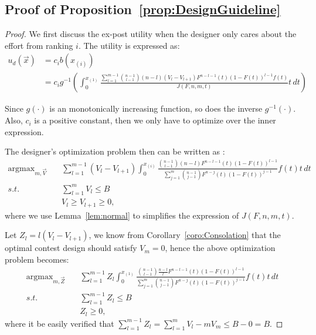 \subsection*{Proof of Proposition~\ref{prop:DesignGuideline}}
\begin{proof}
    We first discuss the ex-post utility when the designer only cares about the effort from ranking $i$. The utility is expressed as:
    \[
    \begin{aligned}
        u_d(\vec{x})  & = c_i b(x_{(i)}) \\
             & = c_ig^{-1}\left(\int_{0}^{x_{(1)}}\frac{\sum_{l=1}^{m-1}\binom{n-1}{l-1}(n-l)(V_l-V_{l+1})F^{n-l-1}(t)(1-F(t))^{l-1}f(t)}{J(F,n,m,t)} t\, dt \right)
    \end{aligned}
    \]
    
    Since $g(\cdot)$ is an monotonically increasing function, so does the inverse $g^{-1}(\cdot)$. Also, $c_i$ is a positive constant, then we only have to optimize over the inner expression. 

    The designer's optimization problem then can be written as :
    \[
    \begin{aligned}
        \mathop{\arg \max}_{m,\vec{V}} \quad & \sum_{l=1}^{m-1}(V_l-V_{l+1})\int_{0}^{x_{(i)}}\frac{\binom{n-1}{l-1}(n-l)F^{n-l-1}(t)(1-F(t))^{l-1}}{\sum_{j=1}^{m}\binom{n-1}{j-1}F^{n-j}(t)(1-F(t))^{j-1}}f(t) t \, dt \\
        s.t. \quad & \sum_{l=1}^{m} V_l \leq B \\
            & V_l  \geq V_{l+1} \geq 0,
    \end{aligned}
    \]
    where we use Lemma~\ref{lem:normal} to simplifies the expression of $J(F,n,m,t)$. 

    Let $Z_l=l(V_l-V_{l+1})$, we know from Corollary~\ref{coro:Consolation} that the optimal contest design should satisfy $V_m=0$, hence the above optimization problem becomes:
    \begin{equation}\label{eq:ExpostHighestObj}
    \begin{aligned}
        \mathop{\arg \max}_{m,\vec{Z}} \quad & \sum_{l=1}^{m-1}Z_l\int_{0}^{x_{(1)}}\frac{\binom{n-1}{l-1}\frac{n-l}{l}F^{n-l-1}(t)(1-F(t))^{l-1}}{\sum_{j=1}^{m}\binom{n-1}{j-1}F^{n-j}(t)(1-F(t))^{j-1}}f(t) t \, dt \\
        s.t. \quad & \sum_{l=1}^{m-1} Z_l \leq B \\
            & Z_l \geq 0,
    \end{aligned}
    \end{equation}
    where it be easily verified that $\sum_{l=1}^{m-1} Z_l = \sum_{l=1}^{m} V_l -mV_m\leq B-0=B$. 


\end{proof}
